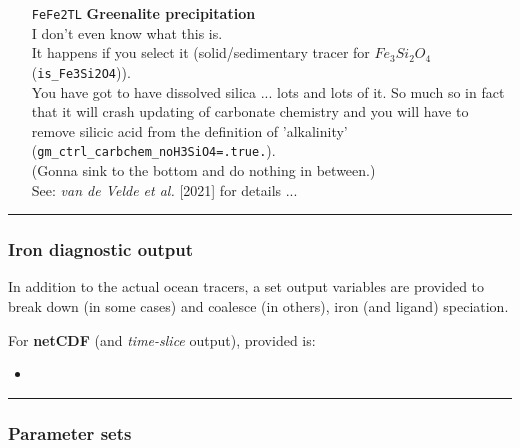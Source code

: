 \begin{itemize}[noitemsep]
\vspace{1mm}
\item [\texttt{FeFe2TL}] \textbf{Greenalite precipitation}
\\I don't even know what this is.
\\It happens if you select it (solid/sedimentary tracer  for \(Fe_{3}Si_{2}O_{4}\) (\texttt{is\_Fe3Si2O4})).
\\You have got to have dissolved silica ... lots and lots of it. So much so in fact that it will crash updating of carbonate chemistry and you will have to remove silicic acid from the definition of 'alkalinity' (\texttt{gm\_ctrl\_carbchem\_noH3SiO4=.true.}).
\\(Gonna sink to the bottom and do nothing in between.)
\\See: \textit{van de Velde et al.} [2021] for details ...

\end{itemize}

%
\noindent\rule{4cm}{0.5pt}
\subsubsection{Iron diagnostic output}
\vspace{2mm}

In addition to the actual ocean tracers, a set output variables are provided to break down (in some cases) and coalesce (in others), iron (and ligand) speciation.

For \textbf{netCDF} (and \textit{time-slice} output), provided is:

\begin{itemize}[noitemsep]
\vspace{1mm}
\item
\end{itemize}





%
\noindent\rule{4cm}{0.5pt}
\subsubsection{Parameter sets}
\vspace{2mm}


